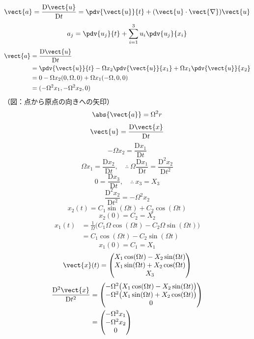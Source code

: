 \[ \vect{a}=\frac{\mathrm{D}\vect{u}}{\mathrm{D}t}=\pdv{\vect{u}}{t}+(\vect{u}\cdot\vect{\nabla})\vect{u} \]
\[ a_{j}=\pdv{u_{j}}{t}+\sum_{i=1}^{3}u_{i}\pdv{u_{j}}{x_{i}} \]
\begin{align*}
\vect{a}&=\frac{\mathrm{D}\vect{u}}{\mathrm{D}t}\\
&=\pdv{\vect{u}}{t}-\Omega x_{2}\pdv{\vect{u}}{x_{1}}+\Omega x_{1}\pdv{\vect{u}}{x_{2}}\\
&=0-\Omega x_{2}(0,\Omega,0)+\Omega x_{1}(-\Omega,0,0)\\
&=(-\Omega^{2}x_{1},-\Omega^{2}x_{2},0)
\end{align*}
（図：点から原点の向きへの矢印）
\[ \abs{\vect{a}}=\Omega^{2}r \]
\[ \vect{u}=\frac{\mathrm{D}\vect{x}}{\mathrm{D}t} \]
\[ -\Omega x_{2}=\frac{\mathrm{D}x_{1}}{\mathrm{D}t} \]
\[ \Omega x_{1}=\frac{\mathrm{D}x_{2}}{\mathrm{D}t},\quad \therefore\ \Omega\frac{\mathrm{D}x_{1}}{\mathrm{D}t}=\frac{\mathrm{D}^{2}x_{2}}{\mathrm{D}t^{2}} \]
\[ 0=\frac{\mathrm{D}x_{3}}{\mathrm{D}t},\quad \therefore\ x_{3}=X_{3} \]
\[ \frac{\mathrm{D}^{2}x_{2}}{\mathrm{D}t^{2}}=-\Omega^{2}x_{2} \]
\[ x_{2}(t)=C_{1}\sin(\Omega t)+C_{2}\cos(\Omega t) \]
\[ x_{2}(0)=C_{2}=X_{2} \]
\begin{align*}
x_{1}(t)&=\frac{1}{\Omega}\bigl(C_{1}\Omega\cos(\Omega t)-C_{2}\Omega\sin(\Omega t)\bigr)\\
&=C_{1}\cos(\Omega t)-C_{2}\sin(\Omega t)
\end{align*}
\[ x_{1}(0)=C_{1}=X_{1} \]
\[ \vect{x}(t)=\begin{pmatrix}X_{1}\cos(\Omega t)-X_{2}\sin(\Omega t)\\X_{1}\sin(\Omega t)+X_{2}\cos(\Omega t)\\X_{3}\end{pmatrix} \]
\begin{align*}
\frac{\mathrm{D}^{2}\vect{x}}{\mathrm{D}t^{2}}&=\begin{pmatrix}-\Omega^{2}\bigl(X_{1}\cos(\Omega t)-X_{2}\sin(\Omega t)\bigr)\\-\Omega^{2}\bigl(X_{1}\sin(\Omega t)+X_{2}\cos(\Omega t)\bigr)\\0\end{pmatrix}\\
&=\begin{pmatrix}-\Omega^{2}x_{1}\\-\Omega^{2}x_{2}\\0\end{pmatrix}
\end{align*}
